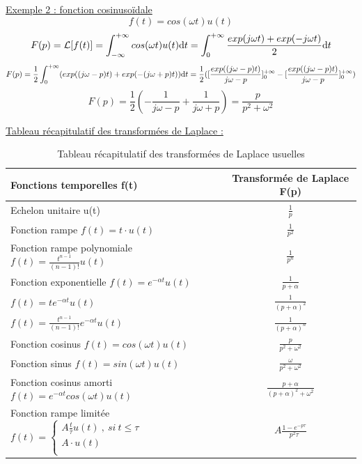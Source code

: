 \documentclass[]{book}
\begin{document}
{	\underline{Exemple 2 : fonction cosinusoïdale}
	\begin{equation*}
	f(t)=cos(\omega t)u(t)
	\end{equation*}
	\begin{equation*}
	F(p)=\mathcal{L}[f(t)]=\int_{-\infty}^{+\infty}cos(\omega t)u(t) \mathrm{d} t=\int_{0}^{+\infty}\frac{exp(j\omega t)+exp(-j\omega t)}{2} \mathrm{d} t
	\end{equation*}
	\begin{equation*}
	F(p)=\frac{1}{2}\int_{0}^{+\infty}(exp((j\omega-p) t)+exp(-(j\omega+p) t)) \mathrm{d} t=\frac{1}{2}([\frac{exp((j\omega-p) t)}{j\omega-p}]_{0}^{+\infty}-[\frac{exp((j\omega-p) t)}{j\omega-p}]_{0}^{+\infty})
	\end{equation*}
	\begin{equation}\label{}
	F(p)=\frac{1}{2}(-\frac{1}{j\omega-p}+\frac{1}{j\omega+p})=\frac{p}{p^{2}+\omega^{2}}
	\end{equation}
	
	\underline{Tableau récapitulatif des transformées de Laplace :}
	
	\begin{table}[h]
		\centering
		\caption{\label{Tab:Transfo_Laplace_usuelle} Tableau récapitulatif des transformées de Laplace usuelles}
		\begin{tabular}{|l|c|}
			\hline
			\textbf{Fonctions temporelles f(t)} & \textbf{Transformée de Laplace F(p)} \\
			\hline
			Echelon unitaire u(t) & $\frac{1}{p}$ \\	
			\hline
			Fonction rampe $f(t)=t\cdot u(t)$ & $\frac{1}{p^{2}}$ \\	
			\hline
			Fonction rampe polynomiale $f(t)=\frac{t^{n-1}}{(n-1)!} u(t)$ & $\frac{1}{p^{n}}$ \\	
			\hline
			Fonction exponentielle $f(t)=e^{-\alpha t} u(t)$ & $\frac{1}{p+\alpha}$ \\	
			\hline
			$f(t)=te^{-\alpha t} u(t)$ & $\frac{1}{(p+\alpha)^{2}}$ \\
			\hline
			$f(t)=\frac{t^{n-1}}{(n-1)!}e^{-\alpha t} u(t)$ & $\frac{1}{(p+\alpha)^{n}}$ \\
			\hline
			Fonction cosinus $f(t)=cos(\omega t)u(t)$ & $\frac{p}{p^{2}+\omega^{2}}$ \\
			\hline
			Fonction sinus $f(t)=sin(\omega t)u(t)$ & $\frac{\omega}{p^{2}+\omega^{2}}$ \\
			\hline
			Fonction cosinus amorti $f(t)=e^{-\alpha t}cos(\omega t)u(t)$ &  $\frac{p+\alpha}{(p+\alpha)^{2}+\omega^{2}}$ \\
			\hline
			Fonction rampe limitée $f(t)= \left\{\begin{array}{l}
			A\frac{t}{\tau}u(t)~,~si~t \leq \tau \\
			A\cdot u(t) \\
			\end{array} 
			\right . $ & $A\frac{1-e^{-p\tau}}{p^{2}\tau}$ \\
			\hline
		\end{tabular}	
	\end{table}


}
\end{document}
